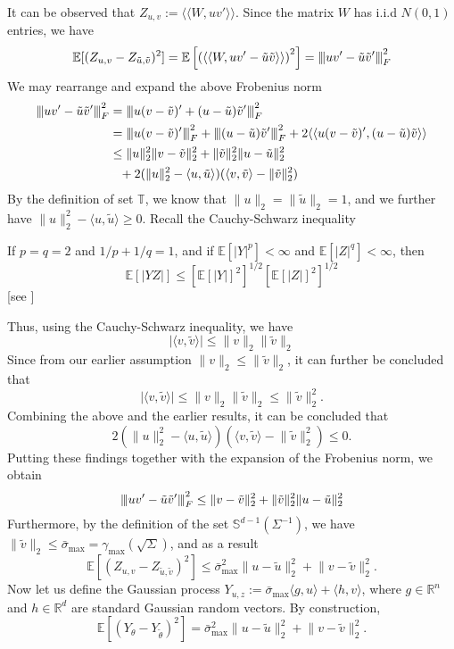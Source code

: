 \documentclass[10pt,handout,english]{beamer}
\newcommand{\E}{\mathbb{E}}
\newcommand{\R}{\mathbb{R}}
\newcommand{\T}{\mathbb{T}}
\renewcommand{\S}{\mathbb{S}}
\newcommand{\vertiii}[1]{{\left\vert\kern-0.25ex\left\vert\kern-0.25ex\left\vert #1 
    \right\vert\kern-0.25ex\right\vert\kern-0.25ex\right\vert}}
\begin{document}
\begin{frame}[allowframebreaks]
It can be observed that $Z_{u,v}:=\langle\langle W,uv'\rangle\rangle$. Since the matrix $W$ has i.i.d $N(0,1)$ entries, we have
\[
\E[(Z_{u,v}-Z_{\tilde{u},\tilde{v}})^2]=\E\left[\left(\langle\langle W,uv'-\tilde{u}\tilde{v}\rangle\rangle\right)^2\right]=\vertiii{uv'-\tilde{u}\tilde{v}'}_F^2
\]
We may rearrange and expand the above Frobenius norm
\begingroup
\allowdisplaybreaks
\begin{align*}
\vertiii{uv'-\tilde{u}\tilde{v}'}_F^2&=\vertiii{u(v-\tilde{v})'+(u-\tilde{u})\tilde{v}'}_F^2\\
&=\vertiii{u(v-\tilde{v})'}_F^2+\vertiii{(u-\tilde{u})\tilde{v}'}_F^2+2\langle\langle u(v-\tilde{v})',(u-\tilde{u})\tilde{v}\rangle\rangle\\
&\leq \lVert u\rVert_2^2\lVert v-\tilde{v}\rVert_2^2+\lVert \tilde{v}\rVert_2^2\lVert u-\tilde{u}\rVert_2^2\\
&\textcolor{white}{=}+2(\lVert u\rVert_2^2-\langle u,\tilde{u}\rangle)(\langle v,\tilde{v}\rangle-\lVert\tilde{v}\rVert_2^2)
\end{align*}
By the definition of set $\T$, we know that $\lVert u\rVert_2=\lVert \tilde{u}\rVert_2=1$, and we further have $\lVert u\rVert_2^2-\langle u,\tilde{u}\rangle\geq 0$. Recall the Cauchy-Schwarz inequality 
\begin{definition}
If $p=q=2$ and $1/p+1/q=1$, and if $\E[\lvert Y\rvert^p]<\infty$ and $\E[\lvert Z\rvert^q]<\infty$, then 
\[
\E[\lvert YZ\rvert]\leq [\E[\lvert Y\rvert]^2]^{1/2}[\E[\lvert Z\rvert]^2]^{1/2}
\] 
[see \citet{white2014asymptotic}]
\end{definition}
\endgroup
Thus, using the Cauchy-Schwarz inequality, we have
\[
\lvert\langle v,\tilde{v}\rangle\rvert\leq \lVert v\rVert_2\lVert \tilde{v}\rVert_2
\]
Since from our earlier assumption $\lVert v\rVert_2\leq \lVert \tilde{v}\rVert_2$, it can further be concluded that
\[
\lvert\langle v,\tilde{v}\rangle\rvert\leq \lVert v\rVert_2\lVert \tilde{v}\rVert_2\leq\lVert\tilde{v}\rVert_2^2.
\]
Combining the above and the earlier results, it can be concluded that
\[
2(\lVert u\rVert_2^2-\langle u,\tilde{u}\rangle)(\langle v,\tilde{v}\rangle-\lVert\tilde{v}\rVert_2^2)\leq 0.
\]
Putting these findings together with the expansion of the Frobenius norm, we obtain
\[
\vertiii{uv'-\tilde{u}\tilde{v}'}_F^2\leq \lVert v-\tilde{v}\rVert_2^2+\lVert \tilde{v}\rVert_2^2\lVert u-\tilde{u}\rVert_2^2
\]
Furthermore, by the definition of the set $\S^{d-1}(\Sigma^{-1})$, we have $\lVert\tilde{v}\rVert_2\leq\bar{\sigma}_{\max}=\gamma_{\max}(\sqrt{\Sigma})$, and as a result
\[
\E[(Z_{u,v}-Z_{\tilde{u},\tilde{v}})^2]\leq \bar{\sigma}^2_{\max}\lVert u-\tilde{u}\rVert_2^2+\lVert v-\tilde{v}\rVert_2^2.
\]
Now let us  define the Gaussian process $Y_{u,z}:=\bar{\sigma}_{\max}\langle g,u\rangle+\langle h,v\rangle$, where $g\in\R^n$ and $h\in \R^d$ are standard Gaussian random vectors. By construction, 
\[
\E[(Y_{\theta}-Y_{\tilde{\theta}})^2]=\bar{\sigma}^2_{\max}\lVert u-\tilde{u}\rVert_2^2+\lVert v-\tilde{v}\rVert_2^2.
\]
\end{frame}
\end{document}
